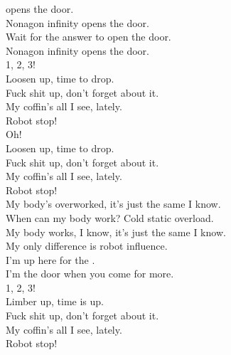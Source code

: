 
\label{album:nonagon-infinity}




 opens the door. \\
Nonagon infinity opens the door. \\
Wait for the answer to open the door. \\
Nonagon infinity opens the door. \\

1, 2, 3! \\

Loosen up, time to drop. \\
Fuck shit up, don't forget about it. \\
My coffin's all I see, lately. \\
Robot stop! \\

Oh! \\

Loosen up, time to drop. \\
Fuck shit up, don't forget about it. \\
My coffin's all I see, lately. \\
Robot stop! \\

My body's overworked, it's just the same I know. \\
When can my body work? Cold static overload. \\
My body works, I know, it's just the same I know. \\
My only difference is robot influence. \\

I'm up here for the . \\
I'm the door when you come for more. \\

1, 2, 3! \\

Limber up, time is up. \\
Fuck shit up, don't forget about it. \\
My coffin's all I see, lately. \\
Robot stop! \\

